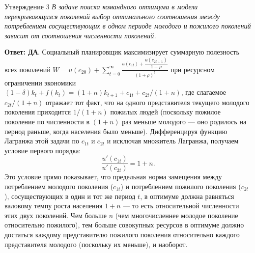 \documentclass[10pt,a4paper]{article}
\newcommand{\qda}{\textbf{\color{yesgreen}Ответ: ДА}}
\newenvironment{answer}[2]{%
  \begin{qbox}{Утверждение #1}
  \textit{#2}\par\smallskip
}{%
  \end{qbox}\vspace{2pt}
}
\begin{document}
\begin{answer}{3}{В задаче поиска командного оптимума в модели перекрывающихся поколений выбор оптимального соотношения между потреблением сосуществующих в одном периоде молодого и пожилого поколений зависит от соотношения численности поколений.}
\qda. Социальный планировщик максимизирует суммарную полезность всех поколений $W = u(c_{20}) + \sum_{t=0}^{\infty}\frac{u(c_{1t})+\dfrac{u(c_{2t+1})}{1+\rho}}{(1+\rho)^{t}}$ при ресурсном ограничении экономики $(1-\delta)k_t+f(k_t)=(1+n)k_{t+1}+c_{1t}+c_{2t}/(1+n)$, где слагаемое $c_{2t}/(1+n)$ отражает тот факт, что на одного представителя текущего молодого поколения приходится $1/(1+n)$ пожилых людей (поскольку пожилое поколение по численности в $(1+n)$ раз меньше молодого — оно родилось на период раньше, когда населения было меньше). Дифференцируя функцию Лагранжа этой задачи по $c_{1t}$ и $c_{2t}$ и исключая множитель Лагранжа, получаем условие первого порядка:
\[
\frac{u'(c_{1t})}{u'(c_{2t})} = 1+n.
\]
Это условие прямо показывает, что предельная норма замещения между потреблением молодого поколения ($c_{1t}$) и потреблением пожилого поколения ($c_{2t}$), сосуществующих в один и тот же период $t$, в оптимуме должна равняться валовому темпу роста населения $1+n$ — то есть относительной численности этих двух поколений. Чем больше $n$ (чем многочисленнее молодое поколение относительно пожилого), тем больше совокупных ресурсов в оптимуме должно достаться каждому представителю пожилого поколения относительно каждого представителя молодого (поскольку их меньше), и наоборот.
\end{answer}
 
\end{document}
